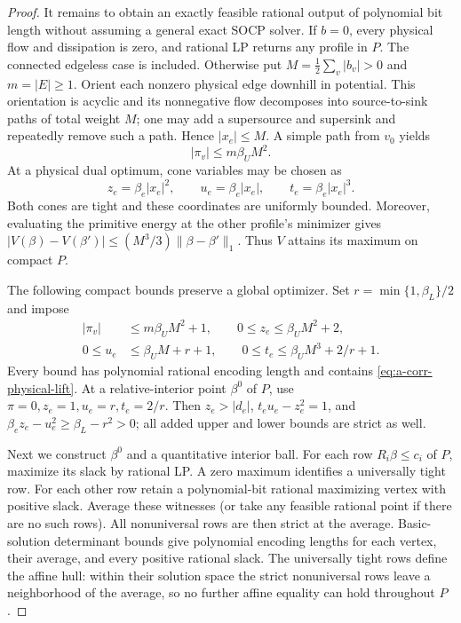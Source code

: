 \begin{proof}
It remains to obtain an exactly feasible rational output of polynomial
bit length without assuming a general exact SOCP solver. If $b=0$, every physical flow
and dissipation is zero, and rational LP returns any profile in $P$.
The connected edgeless case is included. Otherwise put
$M=\tfrac12\sum_v|b_v|>0$ and $m=|E|\ge1$. Orient each nonzero physical
edge downhill in potential. This orientation is acyclic and its
nonnegative flow decomposes into source-to-sink paths of total weight
$M$; one may add a supersource and supersink and repeatedly remove such
a path. Hence $|x_e|\le M$. A simple path from $v_0$ yields
\[
 |\pi_v|\le m\beta_U M^2.
\]
At a physical dual optimum, cone variables may be chosen as
\begin{equation}
 z_e=\beta_e|x_e|^2,\qquad u_e=\beta_e|x_e|,
 \qquad t_e=\beta_e|x_e|^3.
 \label{eq:a-corr-physical-lift}
\end{equation}
Both cones are tight and these coordinates are uniformly bounded.
Moreover, evaluating the primitive energy at the other profile's
minimizer gives
$|V(\beta)-V(\beta')|\le(M^3/3)\|\beta-\beta'\|_1$.
Thus $V$ attains its maximum on compact $P$.

The following compact bounds preserve a global optimizer. Set
$r=\min\{1,\beta_L\}/2$ and impose
\[
 \begin{split}
 |\pi_v|&\le m\beta_U M^2+1,\qquad
 0\le z_e\le\beta_U M^2+2,\\
 0\le u_e&\le\beta_U M+r+1,\qquad
 0\le t_e\le\beta_U M^3+2/r+1.
 \end{split}
\]
Every bound has polynomial rational encoding length and contains
\cref{eq:a-corr-physical-lift}. At a relative-interior point $\beta^0$
of $P$, use $\pi=0,z_e=1,u_e=r,t_e=2/r$. Then
$z_e>|d_e|$, $t_eu_e-z_e^2=1$, and
$\beta_e z_e-u_e^2\ge\beta_L-r^2>0$; all added upper and lower bounds
are strict as well.

Next we construct $\beta^0$ and a quantitative interior ball. For each row
$R_i\beta\le c_i$ of $P$, maximize its slack by rational LP. A zero
maximum identifies a universally tight row. For each other row retain
a polynomial-bit rational maximizing vertex with positive slack.
Average these witnesses (or take any feasible rational point if there
are no such rows). All nonuniversal rows are then strict at the average.
Basic-solution determinant bounds give polynomial encoding lengths for
each vertex, their average, and every positive rational slack. The
universally tight rows define the affine hull: within their solution
space the strict nonuniversal rows leave a neighborhood of the average,
so no further affine equality can hold throughout $P$.


\end{proof}
